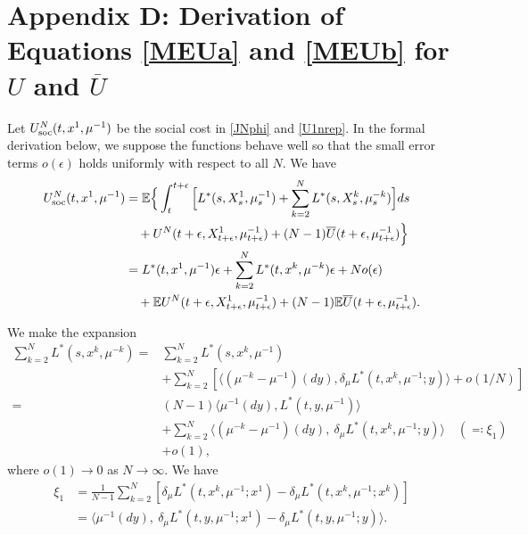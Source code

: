 \documentclass{amsart}
\theoremstyle{definition}
\theoremstyle{remark}
\def\EE{{\mathbb E}}
\numberwithin{equation}{section}
\begin{document}
\section*{Appendix D: Derivation of  Equations \eqref{MEUa} and \eqref{MEUb} for $U$ and $\overline U$}

\renewcommand{\theequation}{D.\arabic{equation}}
\setcounter{equation}{0}
\renewcommand{\thetheorem}{D.\arabic{theorem}}
\setcounter{theorem}{0}
\renewcommand{\thesubsection}{D.\arabic{subsection}}
\setcounter{subsection}{0}


Let $U_{\rm soc}^N(t,x^1, \mu^{-1})$
be the social cost in \eqref{JNphi} and \eqref{U1nrep}.
In the formal derivation below, we suppose the functions behave well so that the small error terms $o(\epsilon)$ holds uniformly with respect to all $N$.
We have
\begin{align}
U_{\rm soc}^N(t,x^1, \mu^{-1})& =\EE\Big\{
\int_t^{t+\epsilon}\Big[ L^*(s, X_s^1,
\mu^{-1}_s)+\sum_{k=2}^N L^*(s, X_s^k,
\mu^{-k}_s)\Big ]ds \label{Udeco} \\
& \quad +U^N(t+\epsilon, X_{t+\epsilon}^1, \mu^{-1}_{t+\epsilon}) + (N-1) \overline U(t+\epsilon, \mu^{-1}_{t+\epsilon})\Big\} \notag  \\
&= L^*(t,x^1, \mu^{-1}) \epsilon + \sum_{k=2}^N L^*(t,x^k, \mu^{-k}) \epsilon
+No(\epsilon)\notag  \\
&  \quad +\EE U^N(t+\epsilon, X_{t+\epsilon}^1, \mu^{-1}_{t+\epsilon}) + (N-1)\EE \overline U(t+\epsilon, \mu^{-1}_{t+\epsilon}).\notag
\end{align}


We make the expansion
\begin{align*}
\sum_{k=2}^N L^*(s, x^k,
\mu^{-k}) =&
\sum_{k=2}^N  L^*(s, x^k,
\mu^{-1})\\
& +\sum_{k=2}^N [\langle ( \mu^{-k}-\mu^{-1})(dy) , \delta_\mu L^*( t, x^k, \mu^{-1};y) \rangle + o(1/N)]\\
=&  (N-1)\langle \mu^{-1} (dy) , L^*(t,y, \mu^{-1})  \rangle\\
& +\sum_{k=2}^N \langle (\mu^{-k}-\mu^{-1})(dy) ,\ \delta_\mu L^*( t, x^k, \mu^{-1};y) \rangle \quad(\eqqcolon\xi_1)  \\
&+o(1),
\end{align*}
where $o(1)\to 0$ as $N\to \infty$.
We have
\begin{align*}
\xi_1&= \frac{1}{N-1}\sum_{k=2}^N [\delta_\mu L^*( t, x^k, \mu^{-1};x^1)  -  \delta_\mu L^*( t, x^k, \mu^{-1};x^k)   ]\\
 &=\langle\mu^{-1}(dy), \    \delta_\mu L^*( t, y, \mu^{-1};x^1)  -  \delta_\mu L^*( t, y, \mu^{-1};y)    \rangle .
\end{align*}
\end{document}
